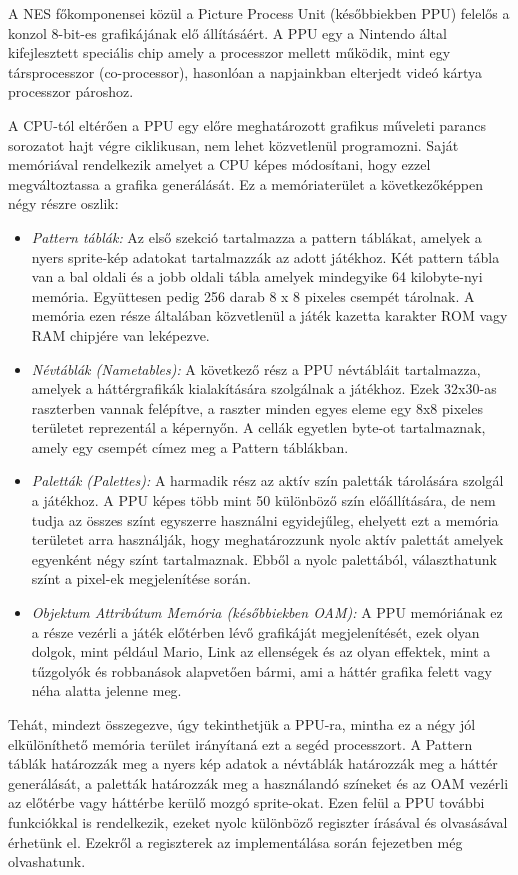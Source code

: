 A NES főkomponensei közül a Picture Process Unit (későbbiekben PPU) felelős a konzol 8-bit-es grafikájának elő állításáért. A PPU egy a Nintendo által kifejlesztett speciális chip amely a processzor mellett működik, mint egy társprocesszor (co-processor), hasonlóan a napjainkban elterjedt videó kártya processzor pároshoz.

A CPU-tól eltérően a PPU egy előre meghatározott grafikus műveleti parancs sorozatot hajt végre ciklikusan, nem lehet közvetlenül programozni. Saját memóriával rendelkezik
amelyet a CPU képes módosítani, hogy ezzel megváltoztassa a grafika generálását. Ez a memóriaterület a következőképpen négy részre oszlik:

\begin{itemize}
	\item \emph{Pattern táblák:} Az első szekció tartalmazza a pattern táblákat, amelyek a nyers sprite-kép adatokat tartalmazzák az adott játékhoz. Két pattern tábla van a bal oldali és a jobb oldali tábla amelyek mindegyike 64 kilobyte-nyi memória. Együttesen pedig 256 darab 8 x 8 pixeles csempét tárolnak. A memória ezen része általában közvetlenül 
	a játék kazetta karakter ROM vagy RAM chipjére van leképezve.
	\item \emph{Névtáblák (Nametables):} A következő rész a PPU névtábláit tartalmazza, amelyek a háttérgrafikák kialakítására szolgálnak a játékhoz. Ezek 32x30-as raszterben vannak felépítve, a raszter minden egyes eleme egy 8x8 pixeles területet reprezentál a képernyőn. A cellák egyetlen byte-ot tartalmaznak, amely egy csempét címez meg a Pattern táblákban.  
	\item \emph{Paletták (Palettes):} A harmadik rész az aktív szín paletták tárolására szolgál a játékhoz. A PPU képes több mint 50 különböző szín előállítására, de nem tudja az összes színt egyszerre használni egyidejűleg, ehelyett ezt a memória területet arra használják, hogy meghatározzunk nyolc aktív palettát amelyek egyenként négy színt tartalmaznak. Ebből a nyolc palettából, választhatunk színt a pixel-ek megjelenítése során.
	\item \emph{Objektum Attribútum Memória (későbbiekben OAM):} A PPU memóriának ez a része vezérli a játék előtérben lévő grafikáját megjelenítését, ezek olyan dolgok, mint például Mario, Link az ellenségek és az olyan effektek, mint a tűzgolyók és robbanások alapvetően bármi, ami a háttér grafika felett vagy néha alatta jelenne meg.
\end{itemize}

Tehát, mindezt összegezve, úgy tekinthetjük a PPU-ra, mintha ez a négy jól elkülöníthető memória terület irányítaná ezt a segéd processzort. A Pattern táblák határozzák meg a nyers kép adatok a névtáblák határozzák meg a háttér generálását, a paletták határozzák meg a használandó színeket és az OAM vezérli az előtérbe vagy háttérbe kerülő mozgó sprite-okat.
Ezen felül a PPU további funkciókkal is rendelkezik, ezeket nyolc különböző regiszter írásával és olvasásával érhetünk el. Ezekről a regiszterek az implementálása során  fejezetben még olvashatunk.

